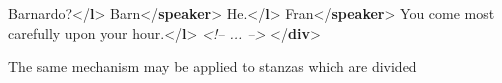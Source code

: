 \documentclass[11pt,twoside]{article}\makeatletter
\begin{document}
\begin{shaded}
\hspace*{1em}\hspace*{1em}Barnardo?{</\textbf{l}>}\mbox{}\newline 
\hspace*{1em}\mbox{}\newline 
\hspace*{1em}\mbox{}\newline 
\hspace*{1em}\hspace*{1em}Barn{</\textbf{speaker}>}\mbox{}\newline 
\hspace*{1em}\hspace*{1em}He.{</\textbf{l}>}\mbox{}\newline 
\hspace*{1em}\mbox{}\newline 
\hspace*{1em}\mbox{}\newline 
\hspace*{1em}\hspace*{1em}Fran{</\textbf{speaker}>}\mbox{}\newline 
\hspace*{1em}\hspace*{1em}You come most carefully upon\mbox{}\newline 
\hspace*{1em}\hspace*{1em}\hspace*{1em}\hspace*{1em}\hspace*{1em}\hspace*{1em} your hour.{</\textbf{l}>}\mbox{}\newline 
\hspace*{1em}\mbox{}\newline 
\textit{<!-- ... -->}\mbox{}\newline 
{}\mbox{}\newline 
{</\textbf{div}>}\end{shaded}\egroup\par \par The same mechanism may be applied to stanzas which are divided
\end{document}
